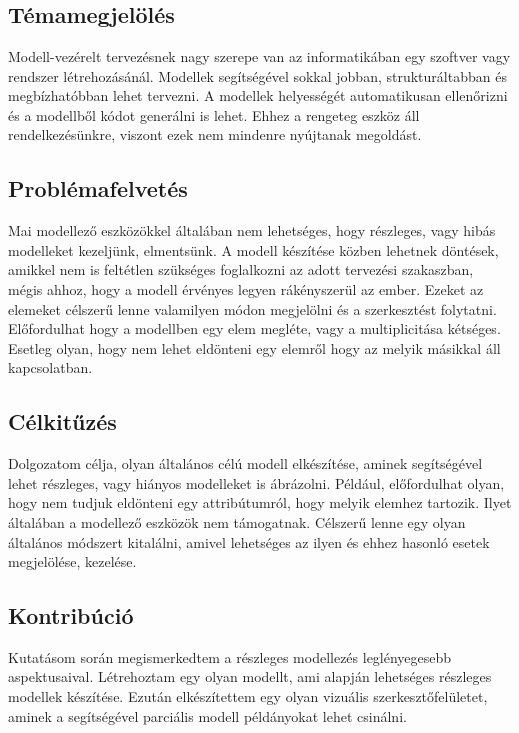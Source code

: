 \chapter{\bevezetes}

\section{Témamegjelölés}
Modell-vezérelt tervezésnek nagy szerepe van az informatikában egy szoftver vagy rendszer létrehozásánál. Modellek segítségével sokkal jobban, strukturáltabban és megbízhatóbban lehet tervezni. A modellek helyességét automatikusan ellenőrizni és a modellből kódot generálni is lehet. Ehhez a rengeteg eszköz áll rendelkezésünkre, viszont ezek nem mindenre nyújtanak megoldást. 
\section{Problémafelvetés}
Mai modellező eszközökkel általában nem lehetséges, hogy részleges, vagy hibás modelleket kezeljünk, elmentsünk. A modell készítése közben lehetnek döntések, amikkel nem is feltétlen szükséges foglalkozni az adott tervezési szakaszban, mégis ahhoz, hogy a modell érvényes legyen rákényszerül az ember. Ezeket az elemeket célszerű lenne valamilyen módon megjelölni és a szerkesztést folytatni. Előfordulhat hogy a modellben egy elem megléte, vagy a multiplicitása kétséges. Esetleg olyan, hogy nem lehet eldönteni egy elemről hogy az melyik másikkal áll kapcsolatban.
\section{Célkitűzés}	
Dolgozatom célja, olyan általános célú modell elkészítése, aminek segítségével lehet részleges, vagy hiányos modelleket is ábrázolni. Például, előfordulhat olyan, hogy nem tudjuk eldönteni egy attribútumról, hogy melyik elemhez tartozik. Ilyet általában a modellező eszközök nem támogatnak. Célszerű lenne egy olyan általános módszert kitalálni, amivel lehetséges az ilyen és ehhez hasonló esetek megjelölése, kezelése.
\section{Kontribúció}
Kutatásom során megismerkedtem a részleges modellezés leglényegesebb aspektusaival. Létrehoztam egy olyan modellt, ami alapján lehetséges részleges modellek készítése. Ezután elkészítettem egy olyan vizuális szerkesztőfelületet, aminek a segítségével parciális modell példányokat lehet csinálni.  

